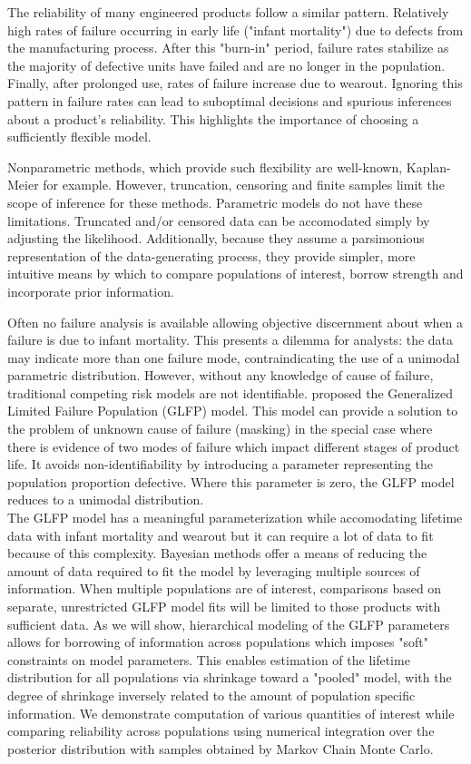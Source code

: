 \documentclass[12pt]{article}
\begin{document}
The reliability of many engineered products follow a similar pattern. Relatively high rates of failure occurring in early life ("infant mortality") due to defects from the manufacturing process. After this "burn-in" period, failure rates stabilize as the majority of defective units have failed and are no longer in the population.  Finally, after prolonged use, rates of failure increase due to wearout.  Ignoring this pattern in failure rates can lead to suboptimal decisions and spurious inferences about a product's reliability. This highlights the importance of choosing a sufficiently flexible model.

Nonparametric methods, which provide such flexibility are well-known, Kaplan-Meier for example. However, truncation, censoring and finite samples limit the scope of inference for these methods. Parametric models do not have these limitations. Truncated and/or censored data can be accomodated simply by adjusting the likelihood. Additionally, because they assume a parsimonious representation of the data-generating process, they provide simpler, more intuitive means by which to compare populations of interest, borrow strength and incorporate prior information. 

Often no failure analysis is available allowing objective discernment about when a failure is due to infant mortality. This presents a dilemma for analysts: the data may indicate more than one failure mode, contraindicating the use of a unimodal parametric distribution. However, without any knowledge of cause of failure, traditional competing risk models are not identifiable. \citet{chan} proposed the Generalized Limited Failure Population (GLFP) model. This model can provide a solution to the problem of unknown cause of failure (masking) in the special case where there is evidence of two modes of failure which impact different stages of product life. It avoids non-identifiability by introducing a parameter representing the population proportion defective. Where this parameter is zero, the GLFP model reduces to a unimodal distribution. \\

The GLFP model has a meaningful parameterization while accomodating lifetime data with infant mortality and wearout but it can require a lot of data to fit because of this complexity. Bayesian methods offer a means of reducing the amount of data required to fit the model by leveraging multiple sources of information. When multiple populations are of interest, comparisons based on separate, unrestricted GLFP model fits will be limited to those products with sufficient data. As we will show, hierarchical modeling of the GLFP parameters allows for borrowing of information across populations which imposes "soft" constraints on model parameters. This enables estimation of the lifetime distribution for all populations via shrinkage toward a "pooled" model, with the degree of shrinkage inversely related to the amount of population specific information. We demonstrate computation of various quantities of interest while comparing reliability across populations using numerical integration over the posterior distribution with samples obtained by  Markov Chain Monte Carlo. \\
\end{document}
